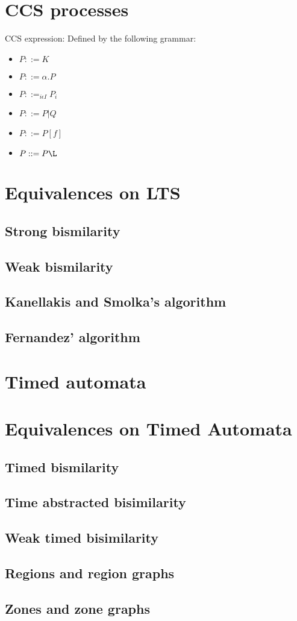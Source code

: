 \documentclass{article}
\begin{document}
\section{CCS processes}

CCS expression: Defined by the following grammar:
\begin{itemize}
\item $P::=K$
\item $P::=\alpha . P$
\item $P::=_{i \epsilon I} P_i$
\item $P::=P|Q$
\item $P::=P[f]$
\item $P::=P\L$
\end{itemize}

\section{Equivalences on LTS}

\subsection{Strong bismilarity}

\subsection{Weak bismilarity}

\subsection{Kanellakis and Smolka's algorithm}

\subsection{Fernandez' algorithm}

\section{Timed automata}

\section{Equivalences on Timed Automata}

\subsection{Timed bismilarity}

\subsection{Time abstracted bisimilarity}

\subsection{Weak timed bisimilarity}

\subsection{Regions and region graphs}

\subsection{Zones and zone graphs}
\end{document}
